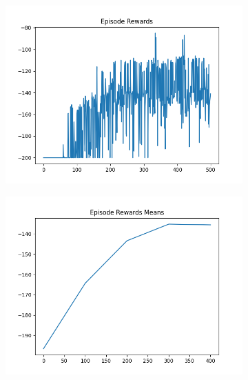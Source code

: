 \begin{figure}[H]
\begin{subfigure}{.47\linewidth}
        \includegraphics[width=\textwidth]{mountain/2024-06-15_13-20-27_dqn_mountaincar_episode_rewards.png}
    \end{subfigure}
    \begin{subfigure}{.47\linewidth}
        \centering
        \includegraphics[width=\textwidth]{mountain/2024-06-15_13-20-27_dqn_mountaincar_episode_rewards_means.png}
    \end{subfigure}
\end{figure}

